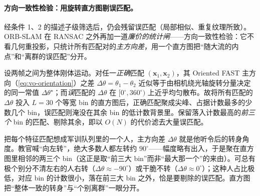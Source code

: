 \paragraph{方向一致性检验：用旋转直方图剔误匹配。}
经条件 1、2 的描述子级筛选后\cite{murartal2015orbslam}，仍会残留误匹配（局部相似、重复纹理所致）。ORB-SLAM 在 RANSAC 之外再加一道\emph{廉价的统计闸}——方向一致性检验：它不看几何重投影，只统计所有匹配对的\emph{主方向差}，用一个直方图把“随大流的内点”和“离群的误匹配”分开。

\begin{proposition}\label{prop:vo-rothist}
设两帧之间为整体刚体运动。对任一\emph{正确}匹配 $(\mathbf{x}_1,\mathbf{x}_2)$，其 Oriented FAST 主方向（\cref{eq:vo-orientation}）之差 $\Delta\theta=\theta_1-\theta_2$ 近似等于由相机绕光轴旋转分量决定的同一常值 $\Delta\theta^\star$；而\emph{误}匹配的 $\Delta\theta$ 在 $[0^\circ,360^\circ)$ 上近乎均匀散布。故将所有匹配的 $\Delta\theta$ 投入 $L=30$ 个等宽 bin 的直方图后，正确匹配聚成尖峰、占据计数最多的少数几个 bin，误匹配则淹没在其余 bin 的低计数背景里。保留落入计数最高的\emph{前三个} bin 的匹配、剔除其余，即以 $O(N)$ 的代价滤去大量误匹配。
\end{proposition}

\begin{insight}
把每个特征匹配想成军训队列里的一个人，主方向差 $\Delta\theta$ 就是他听令后的转身角度。教官喊“向左转”，绝大多数人都左转约 $90^\circ$——幅度略有出入，于是聚在直方图里相邻的两三个 bin（这正是取“前三大 bin”而非“最大那一个”的来由）。可总有极个别分不清左右的人右转（$\Delta\theta\approx-90^\circ$）或干脆不转（$\Delta\theta\approx 0^\circ$）；这种人占比极低，对应 bin 的计数很小，落在前三大 bin 之外，恰是要剔除的误匹配。直方图把“整体一致的转身”与“个别离群”一眼分开。
\end{insight}

